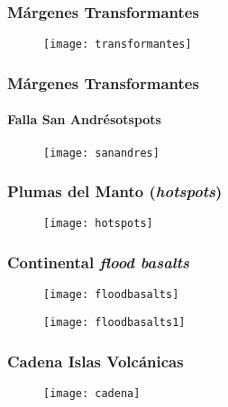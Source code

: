\documentclass{beamer}
\begin{document}
\begin{frame}
\frametitle{Márgenes Transformantes}
\begin{center}
\begin{figure}
\texttt{[image: transformantes]}
\end{figure}
\end{center}
\end{frame}
\begin{frame}
\frametitle{Márgenes Transformantes}
\framesubtitle{Falla San Andrésotspots}
\begin{center}
\begin{figure}
\texttt{[image: sanandres]}
\end{figure}
\end{center}
\end{frame}
\begin{frame}
\frametitle{Plumas del Manto (\emph{hotspots})}
\begin{center}
\begin{figure}
\texttt{[image: hotspots]}
\end{figure}
\end{center}
\end{frame}
\begin{frame}
\frametitle{Continental \emph{flood basalts}}
\begin{center}
\begin{figure}
\texttt{[image: floodbasalts]}
\end{figure}
\end{center}
\end{frame}
\begin{frame}
\begin{center}
\begin{figure}
\texttt{[image: floodbasalts1]}
\end{figure}
\end{center}
\end{frame}
\begin{frame}
\frametitle{Cadena Islas Volcánicas}
\begin{center}
\begin{figure}
\texttt{[image: cadena]}
\end{figure}
\end{center}
\end{frame}
\end{document}
